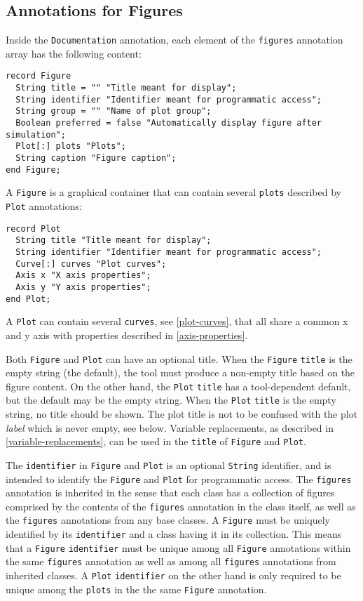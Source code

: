 \subsection{Annotations for Figures}\label{annotations-for-figures}
Inside the \lstinline!Documentation! annotation, each element of the \lstinline!figures! annotation array has the following content:
\begin{lstlisting}[language=modelica]
record Figure
  String title = "" "Title meant for display";
  String identifier "Identifier meant for programmatic access";
  String group = "" "Name of plot group";
  Boolean preferred = false "Automatically display figure after simulation";
  Plot[:] plots "Plots";
  String caption "Figure caption";
end Figure;
\end{lstlisting}

A \lstinline!Figure! is a graphical container that can contain several
\lstinline!plots! described by \lstinline!Plot! annotations:
\begin{lstlisting}[language=modelica]
record Plot
  String title "Title meant for display";
  String identifier "Identifier meant for programmatic access";
  Curve[:] curves "Plot curves";
  Axis x "X axis properties";
  Axis y "Y axis properties";
end Plot;
\end{lstlisting}

A \lstinline!Plot! can contain several \lstinline!curves!, see
\cref{plot-curves}, that all share a common x and y axis with properties
described in \cref{axis-properties}.

Both \lstinline!Figure! and \lstinline!Plot! can have an optional title. When
the \lstinline!Figure! \lstinline!title! is the empty string (the default), the
tool must produce a non-empty title based on the figure content.  On the other
hand, the \lstinline!Plot! \lstinline!title! has a tool-dependent default, but
the default may be the empty string.  When the \lstinline!Plot! \lstinline!title! is the empty string, no
title should be shown. The plot title is not to be confused with the plot
\emph{label} which is never empty, see below. Variable replacements, as
described in \cref{variable-replacements}, can be used in the
\lstinline!title! of \lstinline!Figure! and \lstinline!Plot!.

The \lstinline!identifier! in \lstinline!Figure! and \lstinline!Plot! is an optional \lstinline!String! identifier, and is intended to identify the
\lstinline!Figure! and \lstinline!Plot! for programmatic access.  The \lstinline!figures! annotation is inherited in the sense that each class has
a collection of figures comprised by the contents of the \lstinline!figures! annotation in the class itself, as well as the \lstinline!figures! annotations
from any base classes.  A \lstinline!Figure! must be uniquely identified by its \lstinline!identifier! and a class having it in its collection.  This
means that a \lstinline!Figure! \lstinline!identifier! must be unique among all \lstinline!Figure! annotations within the same \lstinline!figures!
annotation as well as among all \lstinline!figures! annotations from inherited classes.  A \lstinline!Plot! \lstinline!identifier! on the other hand
is only required to be unique among the \lstinline!plots! in the the same \lstinline!Figure! annotation.

